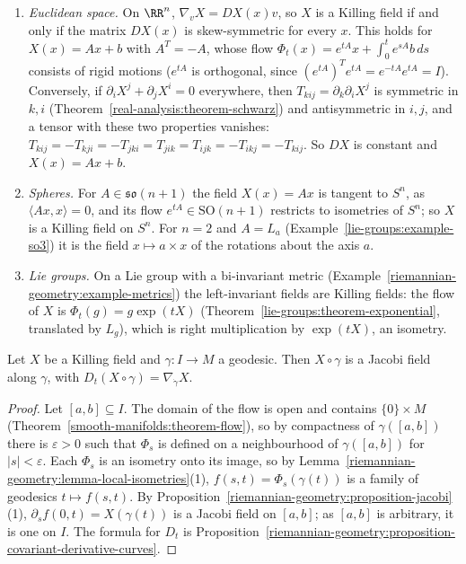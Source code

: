 \begin{example}\label{riemannian-geometry:example-killing-fields}
\begin{enumerate}
\item \emph{Euclidean space.} On $\RR^n$, $\nabla_vX = DX(x)v$, so $X$ is a Killing field if and only if the matrix $DX(x)$ is skew-symmetric for every $x$. This holds for
$X(x) = Ax + b$ with $A^T = -A$, whose flow $\Phi_t(x) = e^{tA}x + \int_0^te^{sA}b\,ds$ consists of rigid motions ($e^{tA}$ is orthogonal, since
$(e^{tA})^Te^{tA} = e^{-tA}e^{tA} = I$). Conversely, if $\partial_iX^j + \partial_jX^i = 0$ everywhere, then $T_{kij} = \partial_k\partial_iX^j$ is symmetric in
$k, i$ (Theorem~\ref{real-analysis:theorem-schwarz}) and antisymmetric in $i, j$, and a tensor with these two properties vanishes:
$T_{kij} = -T_{kji} = -T_{jki} = T_{jik} = T_{ijk} = -T_{ikj} = -T_{kij}$. So $DX$ is constant and $X(x) = Ax + b$.
\item \emph{Spheres.} For $A \in \mathfrak{so}(n + 1)$ the field $X(x) = Ax$ is tangent to $S^n$, as $\langle Ax, x\rangle = 0$, and its flow $e^{tA} \in \mathrm{SO}(n + 1)$
restricts to isometries of $S^n$; so $X$ is a Killing field on $S^n$. For $n = 2$ and $A = L_a$ (Example~\ref{lie-groups:example-so3}) it is the field
$x \mapsto a \times x$ of the rotations about the axis $a$.
\item \emph{Lie groups.} On a Lie group with a bi-invariant metric (Example~\ref{riemannian-geometry:example-metrics}) the left-invariant fields are Killing fields: the
flow of $X$ is $\Phi_t(g) = g\exp(tX)$ (Theorem~\ref{lie-groups:theorem-exponential}, translated by $L_g$), which is right multiplication by $\exp(tX)$, an isometry.
\end{enumerate}
\end{example}

\begin{proposition}\label{riemannian-geometry:proposition-killing-jacobi}
Let $X$ be a Killing field and $\gamma \colon I \to M$ a geodesic. Then $X \circ \gamma$ is a Jacobi field along $\gamma$, with $D_t(X \circ \gamma) = \nabla_{\dot\gamma}X$.
\end{proposition}

\begin{proof}
Let $[a, b] \subseteq I$. The domain of the flow is open and contains $\{0\} \times M$ (Theorem~\ref{smooth-manifolds:theorem-flow}), so by compactness of
$\gamma([a, b])$ there is $\varepsilon > 0$ such that $\Phi_s$ is defined on a neighbourhood of $\gamma([a, b])$ for $|s| < \varepsilon$. Each $\Phi_s$ is an isometry onto
its image, so by Lemma~\ref{riemannian-geometry:lemma-local-isometries}(1), $f(s, t) = \Phi_s(\gamma(t))$ is a family of geodesics $t \mapsto f(s, t)$. By
Proposition~\ref{riemannian-geometry:proposition-jacobi}(1), $\partial_sf(0, t) = X(\gamma(t))$ is a Jacobi field on $[a, b]$; as $[a, b]$ is arbitrary, it is one on $I$.
The formula for $D_t$ is Proposition~\ref{riemannian-geometry:proposition-covariant-derivative-curves}.
\end{proof}

